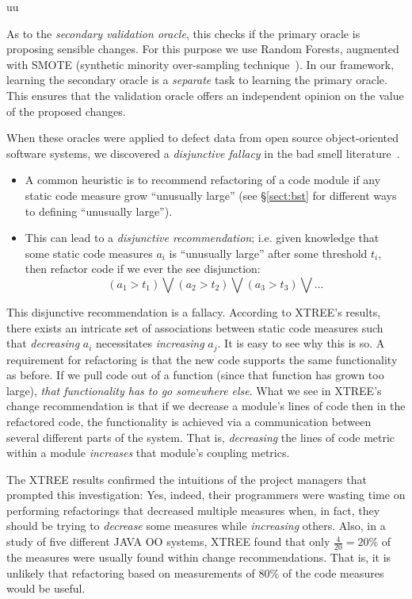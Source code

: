 uu \documentclass[final,twocolumn,5p]{elsarticle}
\newcommand{\bi}{\begin{itemize}[leftmargin=0.4cm]}
\newcommand{\ei}{\end{itemize}}
\newcommand{\tion}[1]{\S\ref{sect:#1}}
\theoremstyle{break}
\begin{document}
As to 
the {\em secondary validation oracle}, this  checks if the primary oracle is proposing
sensible changes. For this purpose we  use Random Forests\cite{XXX}, augmented with SMOTE (synthetic  minority over-sampling technique~\cite{YYY}).
 In our framework,  learning
the secondary oracle is   a {\em separate} task to learning the primary
oracle. This  ensures that the validation oracle offers an independent
opinion on the value of the proposed changes.

When these oracles were applied to defect data from
open source object-oriented software systems, we discovered a {\em disjunctive fallacy}
in the bad smell literature~\cite{erni96,bender99,Shatnawi10,Alves2010,hermans15}.
    
\bi
\item A common heuristic is to recommend refactoring of a code module if any static
code measure grow ``unusually  large''
(see \tion{bst} for   different ways to defining ``unusually large'').
\item This can lead to a {\em disjunctive recommendation}; i.e. given knowledge
that some static
code measures $a_i$ is ``unusually large'' after some threshold $t_i$,
then refactor code if we ever the see disjunction:
\[\left(a_1 > t_1 \right) \bigvee \left(a_2 > t_2\right) \bigvee \left(a_3 > t_3 \right)\bigvee   ...\]
\ei
This disjunctive recommendation is a fallacy.
According to XTREE's results,
there exists an intricate set of associations between static code measures
such that {\em decreasing}  $a_i$ necessitates {\em increasing} $a_j$.
It is easy to see why this is so.
A requirement for  refactoring is that the new code supports the same functionality
as before. If we pull code out of a function (since that function has grown too
large), {\em that functionality has to go somewhere else}. What we see in XTREE's change
recommendation is that if we decrease a module's lines of code  then in the refactored
code, the functionality is achieved via a communication between several different parts
of the system. That is, {\em decreasing} the lines of code metric within a module {\em increases}
that module's coupling metrics.

The XTREE results  confirmed the intuitions
of the project managers that prompted this investigation:
Yes,  indeed, their programmers
were wasting time on   performing refactorings  that  decreased multiple measures when, in fact,
they should be trying to {\em decrease} some measures while {\em increasing} others.
Also, in a study of five different JAVA OO systems,
XTREE found that  only $\frac{4}{20}=20$\% 
  of the measures were usually found within  change recommendations. That is, it is unlikely
  that refactoring based on measurements of  80\% of the code measures would be useful. 
  
\end{document}
